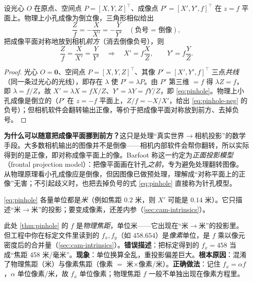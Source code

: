 \begin{theorem}[针孔投影方程]\label{thm:pinhole}
设光心 $O$ 在原点、空间点 $P=[X,Y,Z]^\top$、成像点 $P'=[X',Y',f]^\top$ 在 $z=f$ 平面上。物理上小孔成像为倒立像，三角形相似给出
\begin{equation}
  \frac{Z}{f}=-\frac{X}{X'}=-\frac{Y}{Y'}\quad(\text{负号 = 倒像}),
  \label{eq:pinhole-neg}
\end{equation}
把成像平面对称地放到相机\emph{前方}（消去倒像负号），则
\begin{equation}
  \frac{Z}{f}=\frac{X}{X'}=\frac{Y}{Y'}
  \quad\Longrightarrow\quad
  X'=f\frac{X}{Z},\qquad Y'=f\frac{Y}{Z}.
  \label{eq:pinhole}
\end{equation}
\end{theorem}
\begin{proof}
光心 $O=\mathbf{0}$、空间点 $P=[X,Y,Z]^\top$、其像 $P'=[X',Y',f]^\top$ 三点\emph{共线}（同一条过光心的光线），即存在 $\lambda$ 使 $P'=\lambda P$。由 $P'$ 第三维 $=f$ 得 $\lambda Z=f$，即 $\lambda=f/Z$，故 $X'=\lambda X=fX/Z$、$Y'=\lambda Y=fY/Z$，即 \cref{eq:pinhole}。物理上小孔成像是倒立的（$P'$ 在 $z=-f$ 平面上，$Z/f=-X/X'$，给出 \cref{eq:pinhole-neg} 的负号）；但相机软件会翻转输出正像，等价于把成像平面对称放到前方、去掉负号。
\end{proof}

\begin{note}
\textbf{为什么可以随意把成像平面挪到前方？}\;这只是处理“真实世界$\to$相机投影”的数学手段\cite{gaoxiang2019slam14}。大多数相机输出的图像并不是倒像——相机内部软件会帮你翻转，所以实际得到的是正像，即对称成像平面上的像。Barfoot\cite{barfoot2024state} 称这一约定为\emph{正面投影模型}（frontal projection model）：把像平面画在针孔\emph{之前}，专为避免处理翻转图像。从物理原理看小孔成像应是倒像，但因图像已做预处理，理解成“对称平面上的正像”无害；不引起歧义时，也把去掉负号的式 \eqref{eq:pinhole} 直接称为针孔模型。
\end{note}

\noindent \cref{eq:pinhole} 各量单位都是\emph{米}（例如焦距 $0.2$ 米，则 $X'$ 可能是 $0.14$ 米）。它只描述“米$\to$米”的投影；要变成像素，还差内参（\cref{sec:cam-intrinsics}）。

\begin{pitfall}
此处 \cref{thm:pinhole} 的 $f$ 是\emph{物理焦距}，单位米——它出现在“米$\to$米”的投影里。但工程中你在标定文件里读到的 $f_x,f_y$（如 $458.654$）是\emph{像素}单位，是 $f$ 乘以像元密度后的合并量（\cref{sec:cam-intrinsics}）。\textbf{错误描述}：把标定得到的 $f_x=458$ 当成“焦距 458 米/毫米”。\textbf{现象}：单位换算全乱，重投影偏差巨大。\textbf{根本原因}：混淆了物理焦距（米）与像素焦距（像素 $=$ 米$\times$像素/米）。\textbf{正确做法}：记住 $f_x=\alpha f$，$\alpha$ 单位像素/米，故 $f_x$ 单位像素；物理焦距 $f$ 一般不单独出现在像素方程里。
\end{pitfall}


